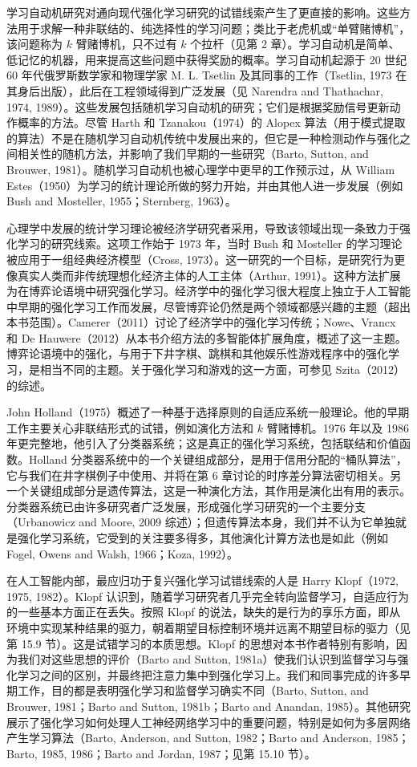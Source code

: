 \documentclass[UTF8, 12pt, fontset=fandol, oneside]{ctexart}
\begin{document}
学习自动机研究对通向现代强化学习研究的试错线索产生了更直接的影响。这些方法用于求解一种非联结的、纯选择性的学习问题；类比于老虎机或“单臂赌博机”，该问题称为 $k$ 臂赌博机，只不过有 $k$ 个拉杆（见第 2 章）。学习自动机是简单、低记忆的机器，用来提高这些问题中获得奖励的概率。学习自动机起源于 20 世纪 60 年代俄罗斯数学家和物理学家 M. L. Tsetlin 及其同事的工作（Tsetlin, 1973 在其身后出版），此后在工程领域得到广泛发展（见 Narendra and Thathachar, 1974, 1989）。这些发展包括随机学习自动机的研究；它们是根据奖励信号更新动作概率的方法。尽管 Harth 和 Tzanakou（1974）的 Alopex 算法（用于模式提取的算法）不是在随机学习自动机传统中发展出来的，但它是一种检测动作与强化之间相关性的随机方法，并影响了我们早期的一些研究（Barto, Sutton, and Brouwer, 1981）。随机学习自动机也被心理学中更早的工作预示过，从 William Estes（1950）为学习的统计理论所做的努力开始，并由其他人进一步发展（例如 Bush and Mosteller, 1955；Sternberg, 1963）。

心理学中发展的统计学习理论被经济学研究者采用，导致该领域出现一条致力于强化学习的研究线索。这项工作始于 1973 年，当时 Bush 和 Mosteller 的学习理论被应用于一组经典经济模型（Cross, 1973）。这一研究的一个目标，是研究行为更像真实人类而非传统理想化经济主体的人工主体（Arthur, 1991）。这种方法扩展为在博弈论语境中研究强化学习。经济学中的强化学习很大程度上独立于人工智能中早期的强化学习工作而发展，尽管博弈论仍然是两个领域都感兴趣的主题（超出本书范围）。Camerer（2011）讨论了经济学中的强化学习传统；Nowe、Vrancx 和 De Hauwere（2012）从本书介绍方法的多智能体扩展角度，概述了这一主题。博弈论语境中的强化，与用于下井字棋、跳棋和其他娱乐性游戏程序中的强化学习，是相当不同的主题。关于强化学习和游戏的这一方面，可参见 Szita（2012）的综述。

John Holland（1975）概述了一种基于选择原则的自适应系统一般理论。他的早期工作主要关心非联结形式的试错，例如演化方法和 $k$ 臂赌博机。1976 年以及 1986 年更完整地，他引入了分类器系统；这是真正的强化学习系统，包括联结和价值函数。Holland 分类器系统中的一个关键组成部分，是用于信用分配的“桶队算法”，它与我们在井字棋例子中使用、并将在第 6 章讨论的时序差分算法密切相关。另一个关键组成部分是遗传算法，这是一种演化方法，其作用是演化出有用的表示。分类器系统已由许多研究者广泛发展，形成强化学习研究的一个主要分支（Urbanowicz and Moore, 2009 综述）；但遗传算法本身，我们并不认为它单独就是强化学习系统，它受到的关注要多得多，其他演化计算方法也是如此（例如 Fogel, Owens and Walsh, 1966；Koza, 1992）。

在人工智能内部，最应归功于复兴强化学习试错线索的人是 Harry Klopf（1972, 1975, 1982）。Klopf 认识到，随着学习研究者几乎完全转向监督学习，自适应行为的一些基本方面正在丢失。按照 Klopf 的说法，缺失的是行为的享乐方面，即从环境中实现某种结果的驱力，朝着期望目标控制环境并远离不期望目标的驱力（见第 15.9 节）。这是试错学习的本质思想。Klopf 的思想对本书作者特别有影响，因为我们对这些思想的评价（Barto and Sutton, 1981a）使我们认识到监督学习与强化学习之间的区别，并最终把注意力集中到强化学习上。我们和同事完成的许多早期工作，目的都是表明强化学习和监督学习确实不同（Barto, Sutton, and Brouwer, 1981；Barto and Sutton, 1981b；Barto and Anandan, 1985）。其他研究展示了强化学习如何处理人工神经网络学习中的重要问题，特别是如何为多层网络产生学习算法（Barto, Anderson, and Sutton, 1982；Barto and Anderson, 1985；Barto, 1985, 1986；Barto and Jordan, 1987；见第 15.10 节）。
\end{document}
